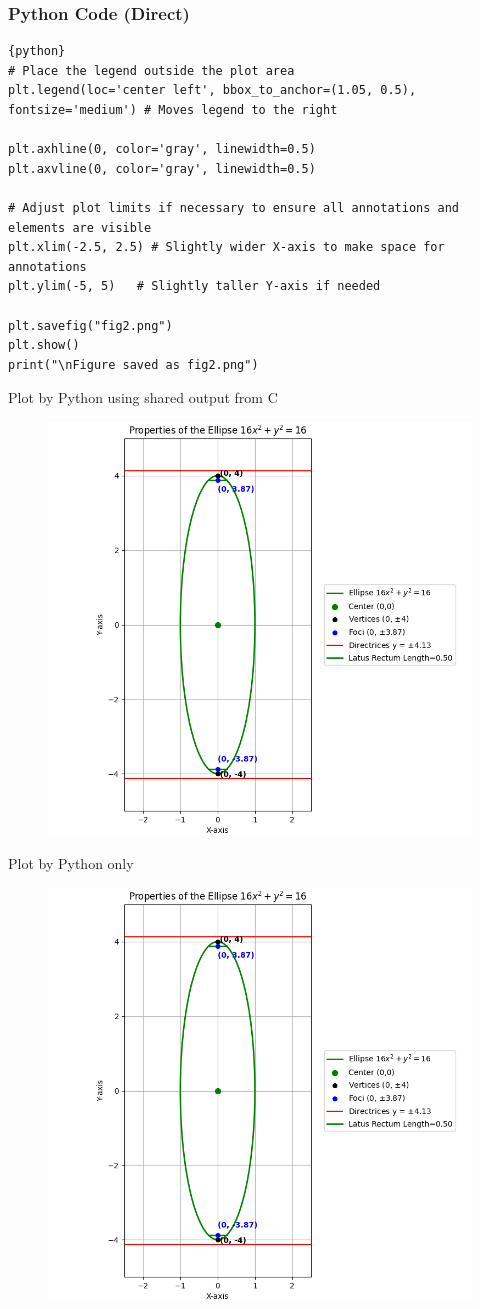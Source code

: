 \documentclass{beamer}
\begin{document}
\begin{frame}[fragile]
\frametitle{Python Code (Direct)}
\begin{lstlisting}{python}
# Place the legend outside the plot area
plt.legend(loc='center left', bbox_to_anchor=(1.05, 0.5), fontsize='medium') # Moves legend to the right

plt.axhline(0, color='gray', linewidth=0.5)
plt.axvline(0, color='gray', linewidth=0.5)

# Adjust plot limits if necessary to ensure all annotations and elements are visible
plt.xlim(-2.5, 2.5) # Slightly wider X-axis to make space for annotations
plt.ylim(-5, 5)   # Slightly taller Y-axis if needed

plt.savefig("fig2.png")
plt.show()
print("\nFigure saved as fig2.png")
\end{lstlisting}
\end{frame}

\begin{frame}{Plot by Python using shared output from C}
\begin{figure}[H]
\centering
\includegraphics[width=0.7\columnwidth]{../figs/fig1.png}
\caption{}
\label{fig:1}
\end{figure}
\end{frame}

\begin{frame}{Plot by Python only}
\begin{figure}[H]
\centering
\includegraphics[width=0.7\columnwidth]{../figs/fig2.png}
\caption{}
\label{fig:2}
\end{figure}
\end{frame}
\end{document}
